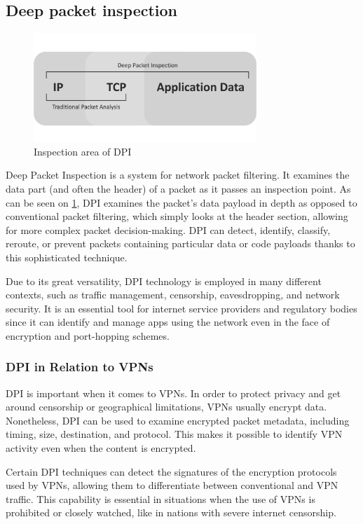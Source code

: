 \documentclass[12pt, fleqn, a4paper]{article}
\begin{document}
\subsection{Deep packet inspection}
\begin{figure}[H]
	\centering
	\includegraphics[width=0.75\textwidth]{img/DPI.png}
	\caption{Inspection area of DPI}
  \label{fig:dpiinspect}
\end{figure}
Deep Packet Inspection is a system for network packet filtering. It examines the data part (and often the header) of a packet as it passes an inspection point. 
As can be seen on \cref{fig:dpiinspect}, DPI examines the packet's data payload in depth as opposed to conventional packet filtering, which simply looks at the header section, allowing for more complex packet decision-making. DPI can detect, identify, classify, reroute, or prevent packets containing particular data or code payloads thanks to this sophisticated technique.

Due to its great versatility, DPI technology is employed in many different contexts, such as traffic management, censorship, eavesdropping, and network security. It is an essential tool for internet service providers and regulatory bodies since it can identify and manage apps using the network even in the face of encryption and port-hopping schemes.

\subsubsection{DPI in Relation to VPNs}
DPI is important when it comes to VPNs. In order to protect privacy and get around censorship or geographical limitations, VPNs usually encrypt data. Nonetheless, DPI can be used to examine encrypted packet metadata, including timing, size, destination, and protocol. This makes it possible to identify VPN activity even when the content is encrypted.

Certain DPI techniques can detect the signatures of the encryption protocols used by VPNs, allowing them to differentiate between conventional and VPN traffic. This capability is essential in situations when the use of VPNs is prohibited or closely watched, like in nations with severe internet censorship.
\end{document}
